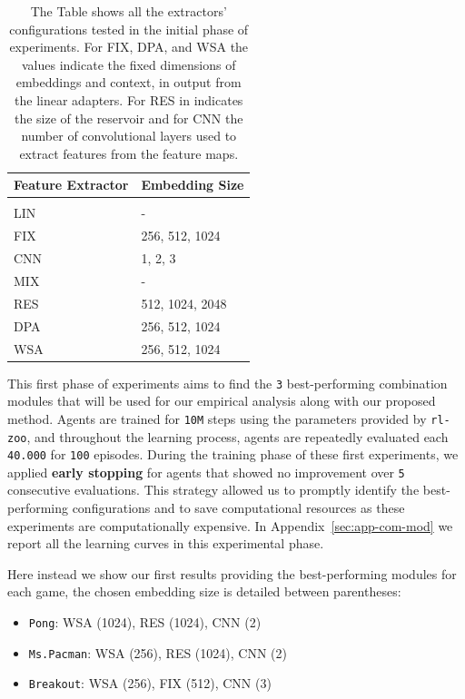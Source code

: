 \begin{table}[ht]
    \begin{center}
        \begin{tabular}{ll}
            \multicolumn{1}{l}{\bf Feature Extractor}  &\multicolumn{1}{l}{\bf Embedding Size}
            \\ \hline \\
            LIN              &  - \\
            FIX        & 256, 512, 1024 \\
            CNN       & 1, 2, 3\\
            MIX                             & - \\
            RES           & 512, 1024, 2048 \\
            DPA             & 256, 512, 1024 \\
            WSA         & 256, 512, 1024 \\

        \end{tabular}
    \end{center}
    \caption{The Table shows all the extractors' configurations tested in the initial phase of experiments. For FIX, DPA, and WSA the values indicate the fixed dimensions of embeddings and context, in output from the linear adapters. For RES  in indicates the size of the reservoir and for CNN the number of convolutional layers used to extract features from the feature maps.}
    \label{tab:emb_siz_modules}
\end{table}


This first phase of experiments aims to find the \texttt{3} best-performing combination modules that will be used for our empirical analysis along with our proposed method.
Agents are trained for \texttt{10M} steps using the parameters provided by \texttt{rl-zoo}, and throughout the learning process, agents are repeatedly evaluated each \texttt{40.000} for \texttt{100} episodes.
During the training phase of these first experiments, we applied \textbf{early stopping} for agents that showed no improvement over \texttt{5} consecutive evaluations.
This strategy allowed us to promptly identify the best-performing configurations and to save computational resources as these experiments are computationally expensive.
In Appendix~\ref{sec:app-com-mod} we report all the learning curves in this experimental phase.

Here instead we show our first results providing the best-performing modules for each game, the chosen embedding size is detailed between parentheses:
\begin{itemize}
    \item \texttt{Pong}: WSA (1024), RES (1024), CNN (2)
    \item \texttt{Ms.Pacman}: WSA (256), RES (1024), CNN (2)
    \item \texttt{Breakout}: WSA (256), FIX (512), CNN (3)
\end{itemize}

